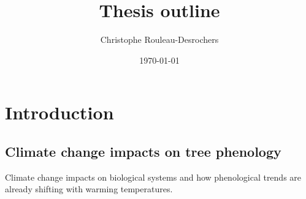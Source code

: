 \documentclass{article}
\title{Thesis outline}
\date{\today}
\author{Christophe Rouleau-Desrochers}
\begin{document}

\maketitle


\section{Introduction}

\subsection{Climate change impacts on tree phenology} 
Climate change impacts on biological systems and how phenological trends are already shifting with warming temperatures. 
\end{document}

